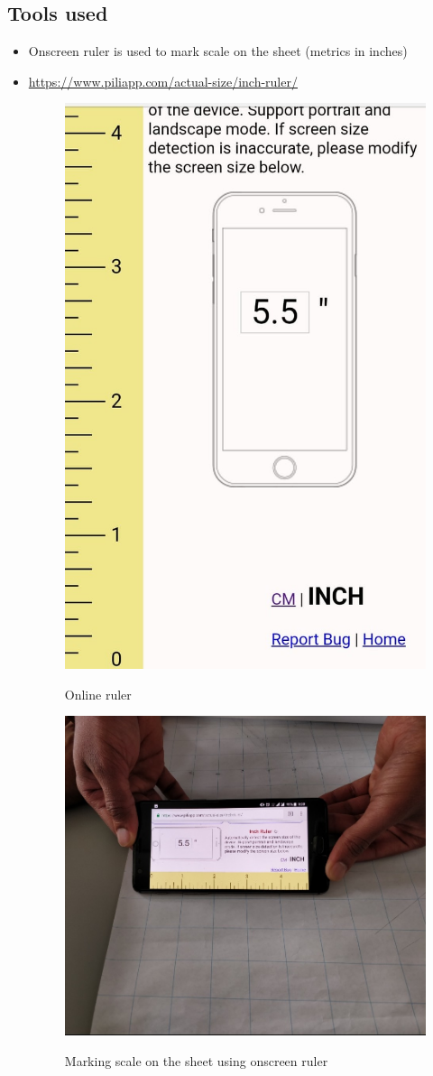 \documentclass[11pt,a4paper,titlepage]{article}
\begin{document}
\subsection{Tools used}
\begin{itemize}
\item Onscreen ruler is used to mark scale on the sheet (metrics in inches)
\item \url{https://www.piliapp.com/actual-size/inch-ruler/}
\begin{figure}[H]
	\centering	
		\includegraphics[width=0.4\linewidth]{screenshot}
		\label{fig:sub1}
	\caption{Online ruler}
  \end{figure}
 \begin{figure}[H]
	\centering	
		\includegraphics[width=0.7\linewidth]{measure}
		\label{fig:sub1}
	\caption{Marking scale on the sheet using onscreen ruler}
  \end{figure}
\end{itemize}
\end{document}
